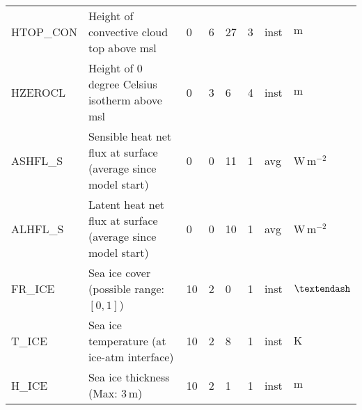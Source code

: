 \begin{longtable}{p{2.0cm}p{5.0cm}p{0.8cm}p{0.8cm}p{0.8cm}p{0.9cm}p{1cm}p{1cm}}
HTOP\_CON                      &  Height of convective cloud top above msl                                              &               0                                   &                     6                       &                    27                      &                 3                           &                      inst                   &        $\mathrm{m}$  \\
HZEROCL                        &  Height of 0 degree Celsius isotherm above msl                                         &               0                                   &                     3                       &                     6                      &                 4                           &                      inst                   &        $\mathrm{m}$  \\
ASHFL\_S                       &  Sensible heat net flux at surface (average since model start)                         &               0                                   &                     0                       &                    11                      &                 1                           &                      avg                    &        $\mathrm{W\,m^{-2}}$  \\
ALHFL\_S                       &  Latent heat net flux at surface (average since model start)                           &               0                                   &                     0                       &                    10                      &                 1                           &                      avg                    &        $\mathrm{W\,m^{-2}}$  \\
FR\_ICE                        &  Sea ice cover  (possible range: $[0,1]$)                                              &              10                                   &                     2                       &                     0                      &                 1                           &                      inst                   &        $\mathrm{\textendash}$  \\
T\_ICE                         &  Sea ice temperature (at ice-atm interface)                                            &              10                                   &                     2                       &                     8                      &                 1                           &                      inst                   &        $\mathrm{K}$  \\
H\_ICE                         &  Sea ice thickness (Max: $3\,\mathrm{m}$)                                              &              10                                   &                     2                       &                     1                      &                 1                           &                      inst                   &        $\mathrm{m}$  \\

\end{longtable}

